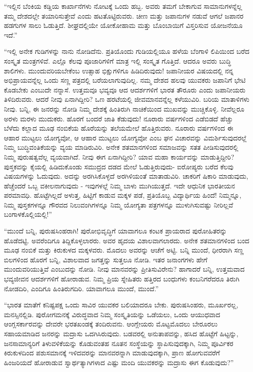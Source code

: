  “ಇಲ್ಲಿನ ಬೆಂಕಿಯ ಕಡ್ಡಿಯ ಕಾರ್ಖಾನೆಗಳು ನೋಟಕ್ಕೆ ಒಂದು ಹಬ್ಬ. ಅವರು ತಮಗೆ ಬೇಕಾಗುವ ಸಾಮಾನುಗಳನ್ನೆಲ್ಲ ತಮ್ಮ ದೇಶದಲ್ಲೇ ತಯಾರಿಸುತ್ತೇವೆ ಎಂದು ಹಟತೊಟ್ಟಿರುವರು. ಚೀಣ ಮತ್ತು ಜಪಾನುಗಳ ನಡುವೆ ಆಗಲೆ ಜಪಾನರ ಹಡಗುಗಳ ಸಾಲು ಓಡುತ್ತಿದೆ. ಶೀಘ್ರದಲ್ಲಿಯೇ ಯೋಕೋಹಾಮ ಮತ್ತು ಬೊಂಬಾಯಿಗೆ ವಿಸ್ತರಿಸುವ ಯೋಜನೆಯೂ ಇದೆ.” 

 “ಇಲ್ಲಿ ಅನೇಕ ಗುಡಿಗಳನ್ನು ನಾನು ನೋಡಿದೆನು. ಪ್ರತಿಯೊಂದು ಗುಡಿಯಲ್ಲಿಯೂ ಹಳೆಯ ಬೆಂಗಾಳಿ ಲಿಪಿಯಿಂದ ಬರೆದ ಸಂಸ್ಕೃತ ಮಂತ್ರಗಳಿವೆ. ಎಲ್ಲೊ ಕೆಲವು ಪೂಜಾರಿಗಳಿಗೆ ಮಾತ್ರ ಇಲ್ಲಿ ಸಂಸ್ಕೃತ ಗೊತ್ತಿದೆ. ಆದರೂ ಅವರು ಬುದ್ಧಿ ಶಾಲಿಗಳು. ಮುಂದುವರಿಯಬೇಕೆಂಬ ಉತ್ಸಾಹ ಭಿಕ್ಷುಗಳಿಗೂ ಹಿಡಿದಿರುವುದು! ಜಪಾನೀಯರ ವಿಷಯದಲ್ಲಿ ನನ್ನ ಅಭಿಪ್ರಾಯವನ್ನೆಲ್ಲ ಒಂದು ಸಣ್ಣ ಪತ್ರದಲ್ಲಿ ಬರೆಯಲಾಗುವುದಿಲ್ಲ. ನಮ್ಮ ದೇಶದ ಹಲವು ಯುವಕರು ಜಪಾನಿಗೆ ಭೇಟಿ ಕೊಡಬೇಕು ಎಂಬುದೇ ನನ್ನಾಸೆ. ಉತ್ತಮವೂ ಭವ್ಯವೂ ಆದ ಆದರ್ಶಗಳಿಗೆ ಭಾರತ ತೌರೂರು ಎಂದು ಜಪಾನೀಯರು ತಿಳಿದಿರುವರು. ಆದರೆ ನೀವು ಏನಾಗಿದ್ದೀರಿ? ಒಣ ಹರಟೆಯಲ್ಲಿ ಜೀವಮಾನವನ್ನೆಲ್ಲ ಕಳೆಯುವಿರಿ. ಬರಿಯ ಮಾತಾಳಿಗಳು ನೀವು. ಬನ್ನಿ, ಈ ಜನರನ್ನು ನೋಡಿ ನಿಮ್ಮ ದೇಶಕ್ಕೆ ಹಿಂತಿರುಗಿ ನಾಚಿಕೆಯಿಂದ ಮುಖವನ್ನು ಮುಚ್ಚಿಕೊಳ್ಳಿ. ನೀವೆಲ್ಲರೂ ಅರಳು ಮರಳು ಮುದುಕರು. ಹೊರಗೆ ಬಂದರೆ ಜಾತಿ ಕೆಡುವುದು! ನೂರಾರು ವರ್ಷಗಳಿಂದ ಎಡೆಬಿಡದೆ ಹೆಚ್ಚು ಬೆಳೆದು ಕಲ್ಲಾದ ಮೂಢ ನಂಬಿಕೆಯ ಹೊರೆಯನ್ನು ತಲೆಯಮೇಲೆ ಹೊತ್ತಿರುವರು. ನೂರಾರು ವರ್ಷಗಳಿಂದ ಈ ಆಹಾರ ಮುಟ್ಟಲು ಯೋಗ್ಯವೋ, ಆ ಆಹಾರ ಮುಟ್ಟಲು ಯೋಗ್ಯವೋ ಎಂಬ ಘನ ವಿಚಾರವನ್ನು ವಿಮರ್ಶಿಸುವುದರಲ್ಲೆ ನಿಮ್ಮ ಬುದ್ಧಿವಂತಿಕೆಯನ್ನು ವ್ಯಯ ಮಾಡಿರುವಿರಿ. ಅನೇಕ ಶತಮಾನಗಳಿಂದ ಸಮಾಜವನ್ನು ಸತತ ಪೀಡಿಸುವುದರಲ್ಲಿ ನಿಮ್ಮ ಪುರುಷತ್ವವೆಲ್ಲ ವ್ಯಯವಾಗಿದೆ. ನೀವು ಈಗ ಏನಾಗಿದ್ದೀರಿ? ಯಾವ ಮಹಾ ಕಾರ್ಯವನ್ನು ಮಾಡುತ್ತಿದ್ದೀರಿ? ಪುಸ್ತಕವನ್ನು ಕೈಯಲ್ಲಿ ಹಿಡಿದುಕೊಂಡು ಸಮುದ್ರದ ದಡದ ಮೇಲೆ ಓಡುತ್ತಿರುವುದು- ಐರೋಪ್ಯರು ಬರೆದ ಕೆಲವು ವಿಷಯಗಳನ್ನು ಓದುವುದು. ಅದನ್ನು ಅರಗಿಸಿಕೊಳ್ಳದೆ ಅರಗಿಳಿಯಂತೆ ಮಾತಾಡುವಿರಿ. ಚಾಕರಿಗೆ ಷಿಕಾರಿ ಮಾಡುವುದು, ಹೆಚ್ಚೆಂದರೆ ಒಬ್ಬ ವಕೀಲನಾಗುವುದು - ಇವುಗಳಲ್ಲೆ ನಿಮ್ಮ ಬಾಳು ಮುಗಿಯುತ್ತದೆ. ಇದೇ ಆಧುನಿಕ ಭಾರತೀಯನ ಪರಮಾವಧಿ. ಹೊಟ್ಟೆಗಿಲ್ಲದೆ ಅಳುತ್ತ, ಹಿಟ್ಟಿಗೆ ಕಾಡುವ ಮಕ್ಕಳ ಪಡೆ, ಪ್ರತಿಯೊಬ್ಬ ವಿದ್ಯಾರ್ಥಿಯ ಹಿಂದೆ! ನಿಮ್ಮನ್ನೂ, ನಿಮ್ಮ ಪುಸ್ತಕಗಳನ್ನೂ ಗೌರವದ ನಿಲುವಂಗಿಗಳನ್ನೂ ನಿಮ್ಮ ಯೋಗ್ಯತಾ ಪತ್ರಗಳನ್ನೂ ಮುಳುಗಿಸುವಷ್ಟು ನೀರಿಲ್ಲವೆ ಬಂಗಾಳಕೊಲ್ಲಿಯಲ್ಲಿ!” 

 “ಮುಂದೆ ಬನ್ನಿ, ಪುರುಷಸಿಂಹರಾಗಿ! ಪುರೋಭಿವೃದ್ಧಿಗೆ ಯಾವಾಗಲೂ ಕಂಟಕ ಪ್ರಾಯರಾದ ಪುರೋಹಿತರನ್ನು ಹೊಡೆದಟ್ಟಿ. ಅವರೆಂದಿಗೂ ತಿದ್ದಿಕೊಳ್ಳಲಾರರು. ಅವರ ಹೃದಯ ವಿಶಾಲವಾಗಲಾರದು. ಅನೇಕ ಶತಮಾನಗಳಿಂದ ಬಂದ ಮೂಢ ನಂಬಿಕೆ ಮತ್ತು ಕಿರುಕುಳದ ಮಕ್ಕಳವರು. ಮೊದಲು ಅವರನ್ನು ಆಚೆಗೆ ಅಟ್ಟಿ. ಬನ್ನಿ ಮುಂದೆ, ಧೀರರಾಗಿ ಸಣ್ಣ ಬಿಲಗಳಿಂದ ಹೊರಗೆ ಬನ್ನಿ, ವಿಶಾಲವಾದ ಜಗತ್ತನ್ನು ಸುತ್ತಲೂ ನೋಡಿ. ಇತರ ಜನಾಂಗಗಳು ಹೇಗೆ ಮುಂದುವರಿಯುತ್ತಿವೆ ಎಂಬುದನ್ನು ನೋಡಿ. ನೀವು ಮಾನವರನ್ನು ಪ್ರೀತಿಸುವಿರೇನು? ಹಾಗಾದರೆ ಬನ್ನಿ, ಉತ್ತಮವಾದ ಭವ್ಯಜೀವನ ಆದರ್ಶಗಳಿಗೆ ಹೋರಾಡುವ. ನಿಮ್ಮ ಪ್ರಿಯ ಸ್ನೇಹಿತರು ಹತ್ತಿರದ ಬಂಧುಗಳು ಕಂಬನಿಗರೆದರೂ ತಿರುಗಿ ನೋಡದಿರಿ, ಎಂದಿಗೂ ಹಿಂತಿರುಗದಿರಿ. ಯಾವಾಗಲೂ ಮುಂದೆ, ಮುಂದೆ.” 

 “ಭಾರತ ಮಾತೆಗೆ ಕನಿಷ್ಟಪಕ್ಷ ಒಂದು ಸಾವಿರ ಯುವಕರ ಬಲಿಯಾದರೂ ಬೇಕು. ಪುರುಷಸಿಂಹರು, ಮೂರ್ಖರಲ್ಲ, ಮನಸ್ಸಿನಲ್ಲಿಡಿ. ಪುರೋಗಮನಕ್ಕೆ ವಿರುದ್ಧವಾದ ನಿಮ್ಮ ಸಂಸ್ಕೃತಿಯನ್ನು ಒಡೆಯಲು, ಒಂದು ಆಯುಧವಾದ ಆಂಗ್ಲಸರ್ಕಾರವನ್ನು ದೇವರೇ ಭರತಖಂಡಕ್ಕೆ ತಂದಿರುವನು. ಆಂಗ್ಲೇಯರು ಮೊಟ್ಟಮೊದಲು ಬೇರೂರಲು ಸಹಾಯಮಾಡಿದ ಜನರನ್ನು ಮದ್ರಾಸು ಒದಗಿಸಿರುವುದು. ಬಡವರಲ್ಲಿ ಅನುತಾಪವನ್ನು, ಹಸಿದ ಹೊಟ್ಟೆಗೆ ಹಿಟ್ಟನ್ನು, ಜನಸಾಮಾನ್ಯರಿಗೆ ತಿಳುವಳಿಕೆಯನ್ನು ಕೊಡುವಂತಹ ನೂತನ ಸಂಸ್ಥೆಯನ್ನು ಸ್ಥಾಪಿಸುವುದಕ್ಕಾಗಿ, ನಿಮ್ಮ ಪೂರ್ವಿಕರ ಕಿರುಕುಳದಿಂದ ಪಶುಸಮಾನಕ್ಕೆ ಇಳಿದವರನ್ನು ಮಾನವರನ್ನಾಗಿ ಮಾಡುವುದಕ್ಕಾಗಿ, ಪ್ರಾಣ ಹೋಗುವವರೆಗೆ ಹಿಂಜರಿಯದೆ ಹೋರಾಡುವ ಸ್ವಾರ್ಥತ್ಯಾಗಿಗಳಾದ ಎಷ್ಟು ಮಂದಿ ಯುವಕರನ್ನು ಮದ್ರಾಸು ಈಗ ಕೊಡುವುದು?” 

